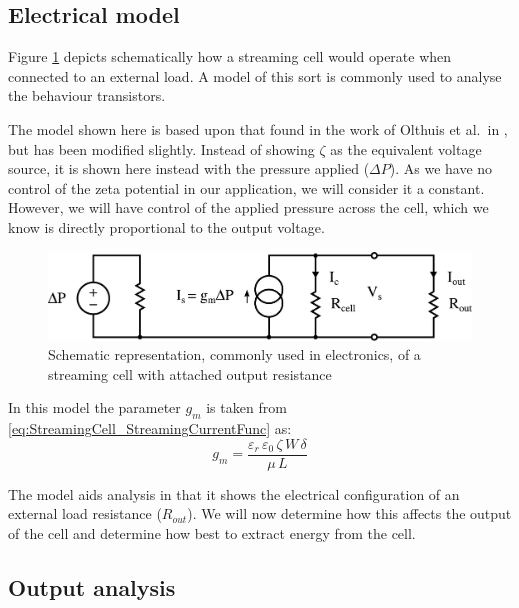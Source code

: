   \subsection{\label{sub:Electrical-model}Electrical model}


    Figure \ref{fig:StreamingCell_Schematic-representation} depicts schematically how a streaming cell would operate when connected to an external load.
    A model of this sort is commonly used to analyse the behaviour transistors.

    The model shown here is based upon that found in the work of Olthuis et al.\ in \cite{Olthuis2005}, but has been modified slightly.
    Instead of showing $\zeta$ as the equivalent voltage source, it is shown here instead with the pressure applied ($\Delta P$).
    As we have no control of the zeta potential in our application, we will consider it a constant.
    However, we will have control of the applied pressure across the cell, which we know is directly proportional to the output voltage.

    \begin{figure}
        \centering
            \includegraphics[width=\textwidth]{content/pt1/01-PowerHarvesting/graphics/StreamingCell_EquivalentCircuit_output}
        \caption{\label{fig:StreamingCell_Schematic-representation}Schematic representation, commonly used in electronics, of a streaming cell with attached output resistance}
    \end{figure}
    In this model the parameter $g_{m}$ is taken from \cref{eq:StreamingCell_StreamingCurrentFunc} as:
    \begin{equation}
        g_{m} = \frac{\varepsilon_{r}\,\varepsilon_{0}\,\zeta\,W\,\delta}{\mu\,L}
    \end{equation}

    The model aids analysis in that it shows the electrical configuration of an external load resistance ($R_{out}$).
    We will now determine how this affects the output of the cell and determine how best to extract energy from the cell.


  \subsection{Output analysis}


